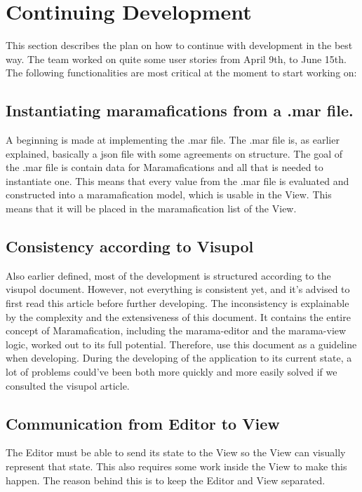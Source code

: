 \documentclass[10pt]{extarticle} %
\begin{document}
    \section{Continuing Development}
    This section describes the plan on how to continue with development in the best way.
    The team worked on quite some user stories from April 9th, to June 15th.
    The following functionalities are most critical at the moment to start working on:

    \subsection{Instantiating maramafications from a .mar file.}
    A beginning is made at implementing the .mar file.
    The .mar file is, as earlier explained, basically a json file with some agreements on structure.
    The goal of the .mar file is contain data for Maramafications and all that is needed to instantiate one.
    This means that every value from the .mar file is evaluated and constructed into a maramafication model, which is usable in the View.
    This means that it will be placed in the maramafication list of the View.

    \subsection{Consistency according to Visupol}
    Also earlier defined, most of the development is structured according to the visupol\cite{visupol} document.
    However, not everything is consistent yet, and it's advised to first read this article before further developing.
    The inconsistency is explainable by the complexity and the extensiveness of this document.
    It contains the entire concept of Maramafication, including the marama-editor and the marama-view logic, worked out to its full potential.
    Therefore, use this document as a guideline when developing.
    During the developing of the application to its current state, a lot of problems could've been both more quickly and more easily solved if we consulted the visupol article.

    \subsection{Communication from Editor to View}
    The Editor must be able to send its state to the View so the View can visually represent that state.
    This also requires some work inside the View to make this happen.
    The reason behind this is to keep the Editor and View separated.
\end{document}
